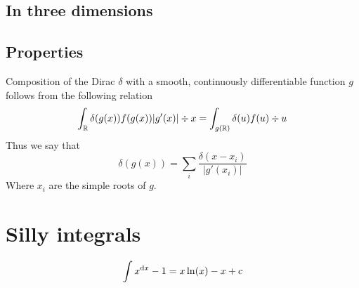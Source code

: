 \subsection{In three dimensions}
\subsection{Properties}

\begin{eigenschap}
Composition of the Dirac $\delta$ with a smooth, continuously differentiable function $g$ follows from the following relation
\[ \int_{\mathbb{R}} \delta(g(x))f(g(x))|g'(x)|\div{x} = \int_{g(\mathbb{R})} \delta(u)f(u)\div{u} \]
Thus we say that
\[ \delta(g(x)) = \sum_i \frac{\delta(x-x_i)}{|g'(x_i)|}\]
Where $x_i$ are the simple roots of $g$.
\end{eigenschap}

\section{Silly integrals}
\[ \int x^{\operatorname{d \!} x}-1 = x\ln(x) - x +c \]